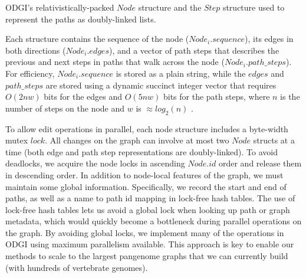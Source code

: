 \documentclass{bioinfo}
\begin{document}
\begin{algorithm}
\caption{ODGI's relativistically-packed $Node$ structure and the $Step$ structure used to represent the paths as doubly-linked lists.}
\label{alg:structs}
\end{algorithm}

Each structure contains the sequence of the node ($Node_i.sequence$), its edges in both directions ($Node_i.edges$), and a vector of path steps that describes the previous and next steps in paths that walk across the node ($Node_i.path\_steps$).
For efficiency, $Node_i.sequence$ is stored as a plain string, while the $edges$ and $path\_steps$ are stored using a dynamic succinct integer vector that requires $O(2nw)$ bits for the edges and $O(5nw)$ bits for the path steps, where $n$ is the number of steps on the node and $w$ is $\approx log_2(n)$ \citep{prezza2017framework}.

To allow edit operations in parallel, each node structure includes a byte-width mutex $lock$.
All changes on the graph can involve at most two $Node$ structs at a time (both edge and path step representations are doubly-linked).
To avoid deadlocks, we acquire the node locks in ascending $Node.id$ order and release them in descending order.
In addition to node-local features of the graph, we must maintain some global information.
Specifically, we record the start and end of paths, as well as a name to path id mapping in lock-free hash tables.
The use of lock-free hash tables lets us avoid a global lock when looking up path or graph metadata, which would quickly become a bottleneck during parallel operations on the graph.
By avoiding global locks, we implement many of the operations in ODGI using maximum parallelism available.
This approach is key to enable our methods to scale to the largest pangenome graphs that we can currently build (with hundreds of vertebrate genomes).
\end{document}
